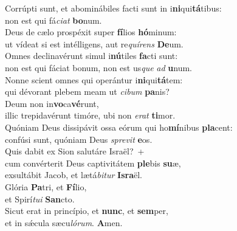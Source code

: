 \evenverse Corrúpti sunt, et abominábiles facti sunt in i\textbf{ni}qui\textbf{tá}tibus:~\*\\
\evenverse non est qui fá\textit{ci}\textit{at} \textbf{bo}num.\\
\oddverse Deus de cælo prospéxit super \textbf{fí}lios \textbf{hó}minum:~\*\\
\oddverse ut vídeat si est intélligens, aut re\textit{quí}\textit{rens} \textbf{De}um.\\
\evenverse Omnes declinavérunt simul i\textbf{nú}tiles \textbf{fa}cti sunt:~\*\\
\evenverse non est qui fáciat bonum, non est us\textit{que} \textit{ad} \textbf{u}num.\\
\oddverse Nonne scient omnes qui operántur i\textbf{ni}qui\textbf{tá}tem:~\*\\
\oddverse qui dévorant plebem meam ut \textit{ci}\textit{bum} \textbf{pa}nis?\\
\evenverse Deum non in\textbf{vo}ca\textbf{vé}runt,~\*\\
\evenverse illic trepidavérunt timóre, ubi non \textit{e}\textit{rat} \textbf{ti}mor.\\
\oddverse Quóniam Deus dissipávit ossa eórum qui ho\textbf{mí}nibus \textbf{pla}cent:~\*\\
\oddverse confúsi sunt, quóniam Deus \textit{spre}\textit{vit} \textbf{e}os.\\
\evenverse Quis dabit ex Sion salutáre Israël?~+\\
\evenverse  cum convérterit Deus captivitátem \textbf{ple}bis \textbf{su}æ,~\*\\
\evenverse exsultábit Jacob, et lætá\textit{bi}\textit{tur} \textbf{Is}\textbf{ra}ël.\\
\oddverse Glória \textbf{Pa}tri, et \textbf{Fí}lio,~\*\\
\oddverse et Spirí\textit{tu}\textit{i} \textbf{San}cto.\\
\evenverse Sicut erat in princípio, et \textbf{nunc}, et \textbf{sem}per,~\*\\
\evenverse et in sǽcula sæcu\textit{ló}\textit{rum}. \textbf{A}men.\\
